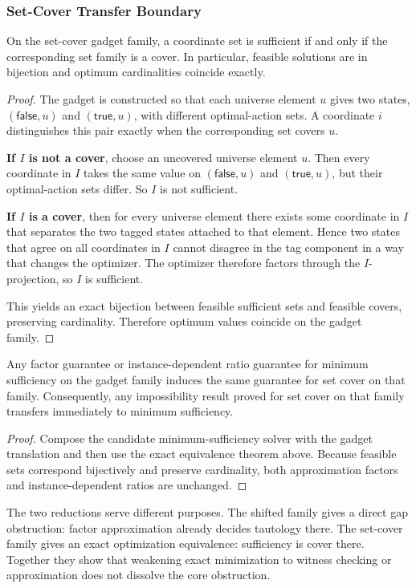 \subsubsection{Set-Cover Transfer Boundary}

\begin{theorem}
On the set-cover gadget family, a coordinate set is sufficient if and only if the corresponding set family is a cover. In particular, feasible solutions are in bijection and optimum cardinalities coincide exactly.
\end{theorem}


\begin{proof}
The gadget is constructed so that each universe element $u$ gives two states, $(\mathsf{false},u)$ and $(\mathsf{true},u)$, with different optimal-action sets. A coordinate $i$ distinguishes this pair exactly when the corresponding set covers $u$.

\textbf{If $I$ is not a cover}, choose an uncovered universe element $u$. Then every coordinate in $I$ takes the same value on $(\mathsf{false},u)$ and $(\mathsf{true},u)$, but their optimal-action sets differ. So $I$ is not sufficient.

\textbf{If $I$ is a cover}, then for every universe element there exists some coordinate in $I$ that separates the two tagged states attached to that element. Hence two states that agree on all coordinates in $I$ cannot disagree in the tag component in a way that changes the optimizer. The optimizer therefore factors through the $I$-projection, so $I$ is sufficient.

This yields an exact bijection between feasible sufficient sets and feasible covers, preserving cardinality. Therefore optimum values coincide on the gadget family.
\end{proof}

\begin{corollary}
Any factor guarantee or instance-dependent ratio guarantee for minimum sufficiency on the gadget family induces the same guarantee for set cover on that family. Consequently, any impossibility result proved for set cover on that family transfers immediately to minimum sufficiency.
\end{corollary}


\begin{proof}
Compose the candidate minimum-sufficiency solver with the gadget translation and then use the exact equivalence theorem above. Because feasible sets correspond bijectively and preserve cardinality, both approximation factors and instance-dependent ratios are unchanged.
\end{proof}

The two reductions serve different purposes. The shifted family gives a direct gap obstruction: factor approximation already decides tautology there. The set-cover family gives an exact optimization equivalence: sufficiency is cover there. Together they show that weakening exact minimization to witness checking or approximation does not dissolve the core obstruction.
